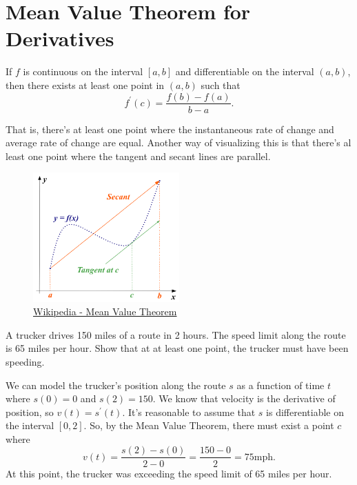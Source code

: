\section{Mean Value Theorem for Derivatives}
\begin{theorem}
	If $f$ is continuous on the interval $[a,b]$ and differentiable on the interval $(a,b)$, then there exists at least one point in $(a,b)$ such that
	\begin{equation*}
		f^\prime(c) = \frac{f(b)-f(a)}{b-a}.
	\end{equation*}
\end{theorem}
\noindent
That is, there's at least one point where the instantaneous rate of change and average rate of change are equal.
Another way of visualizing this is that there's al least one point where the tangent and secant lines are parallel.

\begin{figure}[H]
	\label{mvt}
	\centering
	\includegraphics[width = 0.5\textwidth]{./applications_derivative/mvt.png}
	\caption{\hyperref{https://en.wikipedia.org/wiki/Mean\_value\_theorem}{}{}{Wikipedia - Mean Value Theorem}}
\end{figure}

\begin{example}
	A trucker drives 150 miles of a route in 2 hours.
	The speed limit along the route is 65 miles per hour.
	Show that at at least one point, the trucker must have been speeding.
\end{example}
We can model the trucker's position along the route $s$ as a function of time $t$ where $s(0)=0$ and $s(2)=150$.
We know that velocity is the derivative of position, so $v(t) = s^\prime(t)$.
It's reasonable to assume that $s$ is differentiable on the interval $[0,2]$.
So, by the Mean Value Theorem, there must exist a point $c$ where
\begin{equation*}
	v(t) = \frac{s(2)-s(0)}{2-0} = \frac{150-0}{2} = 75\text{mph}.
\end{equation*}
\indent
At this point, the trucker was exceeding the speed limit of 65 miles per hour.

